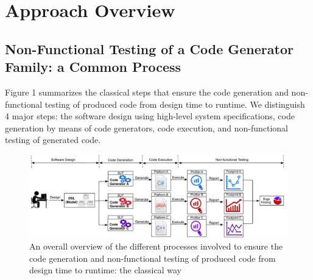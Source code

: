 
\section{Approach Overview}


\subsection{Non-Functional Testing of a Code Generator Family: a Common Process}

Figure 1 summarizes the classical steps that ensure the code generation and non-functional testing of produced code from design time to runtime. 
We distinguish 4 major steps: the software design using high-level system specifications, code generation by means of code generators, code execution, and non-functional testing of generated code. 


\begin{figure}[t]
		\center
		
	\includegraphics[width=0.95\linewidth]{Ressources/background.pdf}
	\caption{An overall overview of the different processes involved to ensure the code generation and non-functional testing of produced code from design time to runtime: the classical way}
\end{figure}


